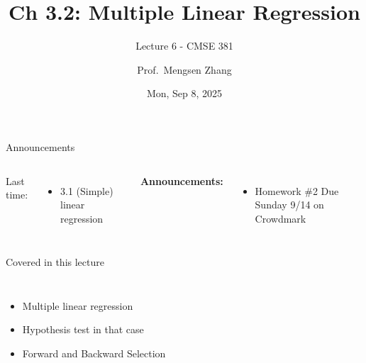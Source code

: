 \documentclass[aspectratio=169,usenames,dvipsnames]{beamer}
\begin{document}
\title[]{Ch 3.2: Multiple Linear Regression}
\subtitle{Lecture 6 - CMSE 381}
\date{Mon, Sep 8, 2025}



\author[Dr.~Zhang]{Prof.~Mengsen Zhang}

\begin{frame}
 \titlepage


\end{frame}
\begin{frame}[c]{Announcements}

\begin{columns}
\centering

	Last time:
	\begin{itemize}
		\item 3.1 (Simple) linear regression
	\end{itemize}
\centering

\textbf{Announcements:}
	\begin{itemize}
		\item Homework \#2 Due Sunday 9/14 on Crowdmark
	\end{itemize}
\end{columns}

\end{frame}
\begin{frame}[c]{Covered in this lecture }

\begin{columns}
\centering
\begin{itemize}
	\item Multiple linear regression
	\item Hypothesis test in that case
	\item Forward and Backward Selection
\end{itemize}
\centering

\end{columns}

\end{frame}
\end{document}
